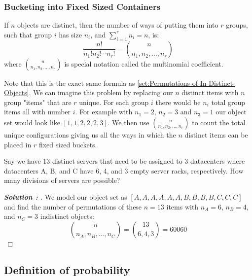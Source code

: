 \documentclass[11pt]{article}
\newenvironment{solution}[1][]{%
  \renewcommand\qedsymbol{$\blacksquare$}%
  \def\temp{\normalfont\bfseries Solution \theexample: #1}
  \begin{proof}[\temp]
  \normalfont %
}{%
  \end{proof}
}
\begin{document}
\subsubsection*{Bucketing into Fixed Sized Containers}
\begin{definition}
  If $n$ objects are distinct, then the number of ways of putting them into $r$ groups, such that group $i$ has size $n_i$, and $\sum_{i=1}^{r} n_i = n$, is:
\[
\frac{n!}{n_1! n_2! \cdots n_r!} = \binom{n}{n_1, n_2, \ldots, n_r}
\]
where $\binom{n}{n_1, n_2, \ldots, n_r}$ is special notation called the multinomial coefficient.
\end{definition}
Note that this is the exact same formula as \ref{set:Permutations-of-In-Distinct-Objects}. We can imagine this problem by replacing our $n$ distinct items
with $n$ group "items" that are $r$ unique. For each group $i$ there would be $n_i$ total group items all with number $i$. For example with $n_1 = 2$,
$n_2 = 3$ and $n_3 = 1$ our object set would look like $[1, 1, 2, 2, 2, 3]$. We then use $\binom{n}{n_1, n_2, \ldots, n_r}$ to count the total unique
configurations giving us all the ways in which the $n$ distinct items can be placed in $r$ fixed sized buckets.
\begin{example}
  Say we have 13 distinct servers that need to be assigned to 3 datacenters where datacenters A, B, and C have 6, 4, and 3 empty server racks, respectively.
  How many divisions of servers are possible? 
\end{example}
\begin{solution}
  We model our object set as $[A,A,A,A,A,A,B,B,B,B,C,C,C]$ and find the number of permutations of these $n=13$ items with $n_A = 6$, $n_B = 4$, and
  $n_C = 3$ indistinct objects:
  \[
    \binom{n}{n_A, n_B, \ldots, n_C} = \binom{13}{6, 4, 3} = 60060
  \] 
\end{solution}

\newpage

\subsection{Definition of probability}
\end{document}
